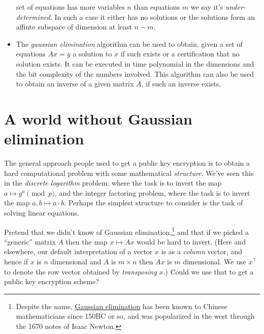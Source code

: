 \begin{itemize}
  set of equations has more variables \(n\) than equations \(m\) we say
  it's \emph{under-determined}. In such a case it either has no
  solutions or the solutions form an affinte subspace of dimension at
  least \(n-m\).
\item
  The \emph{gaussian elimination} algorithm can be used to obtain, given
  a set of equations \(Ax = y\) a solution to \(x\) if such exists or a
  certification that no solution exists. It can be executed in time
  polynomial in the dimensions and the bit complexity of the numbers
  involved. This algorithm can also be used to obtain an inverse of a
  given matrix \(A\), if such an inverse exists.
\end{itemize}

\hypertarget{dimensionsrem}{}

\section{A world without Gaussian
elimination}\label{A-world-without-Gaussian-}

The general approach people used to get a public key encryption is to
obtain a hard computational problem with some mathematical
\emph{structure}. We've seen this in the \emph{discrete logarithm}
problem, where the task is to invert the map \(a \mapsto g^a \pmod{p}\),
and the integer factoring problem, where the task is to invert the map
\(a,b \mapsto a\cdot b\). Perhaps the simplest structure to consider is
the task of solving linear equations.

Pretend that we didn't know of Gaussian elimination,\footnote{Despite
  the name, \href{https://goo.gl/3HNb5U}{Gaussian elimination} has been
  known to Chinese mathematicians since 150BC or so, and was popularized
  in the west through the 1670 notes of Isaac Newton.} and that if we
picked a ``generic'' matrix \(A\) then the map \(x \mapsto Ax\) would be
hard to invert. (Here and elsewhere, our default interpretation of a
vector \(x\) is as a \emph{column} vector, and hence if \(x\) is \(n\)
dimensional and \(A\) is \(m\times n\) then \(Ax\) is \(m\) dimensional.
We use \(x^\top\) to denote the row vector obtained by
\emph{transposing} \(x\).) Could we use that to get a public key
encryption scheme?

